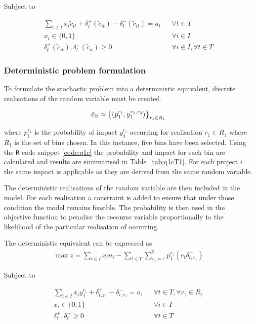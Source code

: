 \documentclass[a4paper,11pt]{article}
\begin{document}
Subject to

\begin{align}
	\sum_{i\in I} x_i\tilde{c}_{it} +\delta_{t}^+(\tilde{c}_{it})- \delta^-_t(\tilde{c}_{it})= a_t && \forall t\in T \label{q1b7}	\\
	x_i \in \{0,1\} && \forall i\in I\\
	\delta_{t}^+(\tilde{c}_{it}), \delta^-_t(\tilde{c}_{it})\geq0 && \forall i\in I ,\forall t\in T
\end{align}

\subsubsection{Deterministic problem formulation}
To formulate the stochastic problem into a deterministic equivalent, discrete realisations of the random variable must be created. 

\begin{equation}
	\tilde{c}_{it} \approx \big{\{}(p_1^{r_1},y_1^{r_1,r_2})\big{\}}_{r_1\in R_1}
\end{equation}

where $p_1^{r_1}$ is the probability of impact $y_1^{r_1}$ occurring for realisation $r_1 \in R_1$ where $R_1$ is the set of bins chosen. In this instance, five bins have been selected. Using the \texttt{R} code snippet \ref{code:q1c} the probability and impact for each bin are calculated and results are summarised in Table~\ref{tab:q1cT1}. For each project $i$ the same impact is applicable as they are derived from the same random variable.

The deterministic realisations of the random variable are then included in the model. For each realisation a constraint is added to ensure that under those condition the model remains feasible. The probability is then used in the objective function to penalise the recourse variable proportionally to the likelihood of the particular realisation of occurring.

The deterministic equivalent can be expressed as
\begin{align}
		\max z = \sum_{i\in I} x_i n_i - \sum_{t\in T}\sum_{r_1=1}^5 p_1^{r_1}(e_t\delta^-_{t,r_1})
\end{align}


Subject to

\begin{align}
	\sum_{i\in I} x_i y_1^{r_1} +\delta_{t,r_1}^+- \delta^-_{t,r_1}= a_t && \forall t\in T,\forall r_1 \in R_1 \label{q1b7}	\\
	x_i \in \{0,1\} && \forall i\in I\\
	\delta_{t}^+, \delta^-_t\geq0 && \forall t\in T
\end{align}
\end{document}
